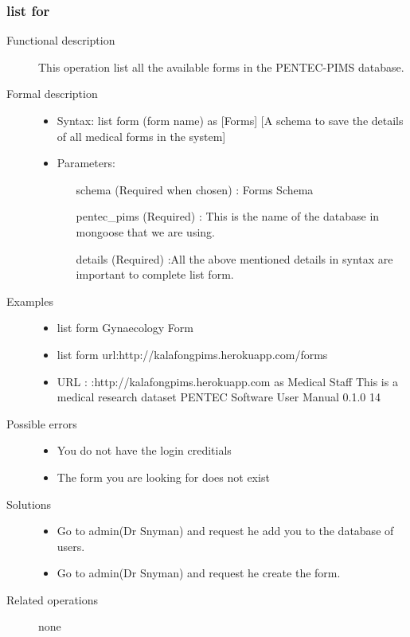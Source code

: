 \documentclass[a4paper]{article}
\begin{document}
\subsubsection{list for}
\begin{description}
\item[Functional description] This operation list all the available forms in the PENTEC-PIMS database.
\item[Formal description]\hfill
\begin{itemize}
	\item Syntax: list form (form name) as [Forms] [A schema to save the details of all medical forms in the system]\\
	\item Parameters:
	\begin{itemize}
		\item [schema] (Required when chosen) : Forms Schema
		\item [pentec\_pims] (Required) : This is the name of the database in mongoose that we are using.
		\item [details] (Required) :All the above mentioned details in syntax are important to complete list form.
	\end{itemize}
\end{itemize}

\item[Examples]\hfill
\begin{itemize}
	\item list form Gynaecology Form
	\item list form url:http://kalafongpims.herokuapp.com/forms
	\item URL : :http://kalafongpims.herokuapp.com as Medical Staff This is a medical research dataset
	PENTEC Software User Manual 0.1.0 14
\end{itemize}

\item[Possible errors]\hfill
\begin{itemize}
	\item You do not have the login creditials
	\item The form you are looking for does not exist
\end{itemize}

\item[Solutions]\hfill
\begin{itemize}
	\item Go to admin(Dr Snyman) and request he add you to the database of users.
	\item Go to admin(Dr Snyman) and request he create the form.
\end{itemize}
\item[Related operations] none

\end{description}
	      
\end{document}
